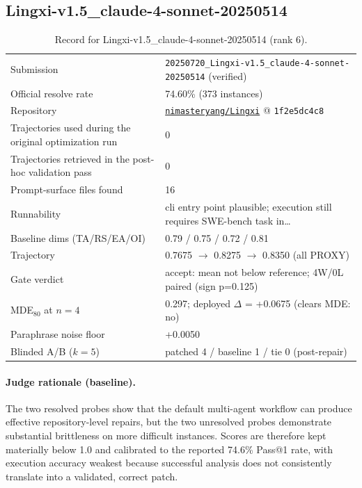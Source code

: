 \subsection{Lingxi-v1.5\_claude-4-sonnet-20250514}
\label{app:agent6}
\begin{table}[H]\centering\scriptsize
\caption{Record for Lingxi-v1.5\_claude-4-sonnet-20250514 (rank 6).}
\begin{tabular}{lp{8.2cm}}\toprule
Submission & \texttt{20250720\_\allowbreak{}Lingxi-v1.5\_\allowbreak{}claude-4-sonnet-20250514} (verified) \\
Official resolve rate & 74.60\% (373 instances) \\
Repository & \href{https://github.com/nimasteryang/Lingxi}{\texttt{nimasteryang/Lingxi}} @ \texttt{1f2e5dc4c8} \\
Trajectories used during the original optimization run & 0 \\
Trajectories retrieved in the post-hoc validation pass & 0 \\
Prompt-surface files found & 16 \\
Runnability & cli entry point plausible; execution still requires SWE-bench task in\ldots{} \\
Baseline dims (TA/RS/EA/OI) & 0.79 / 0.75 / 0.72 / 0.81 \\
Trajectory & 0.7675 $\to$ 0.8275 $\to$ 0.8350 (all PROXY) \\
Gate verdict & accept: mean not below reference; 4W/0L paired (sign p=0.125) \\
MDE$_{80}$ at $n{=}4$ & 0.297; deployed $\Delta$ = +0.0675 (clears MDE: no) \\
Paraphrase noise floor & +0.0050 \\
Blinded A/B ($k{=}5$) & patched 4 / baseline 1 / tie 0 (post-repair) \\
\bottomrule\end{tabular}\end{table}
\paragraph{Judge rationale (baseline).}
The two resolved probes show that the default multi-agent workflow can produce effective repository-level repairs, but the two unresolved probes demonstrate substantial brittleness on more difficult instances. Scores are therefore kept materially below 1.0 and calibrated to the reported 74.6\% Pass@1 rate, with execution accuracy weakest because successful analysis does not consistently translate into a validated, correct patch.
